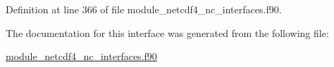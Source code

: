 Definition at line 366 of file module\+\_\+netcdf4\+\_\+nc\+\_\+interfaces.\+f90.



The documentation for this interface was generated from the following file\+:\begin{DoxyCompactItemize}
\item 
\hyperlink{module__netcdf4__nc__interfaces_8f90}{module\+\_\+netcdf4\+\_\+nc\+\_\+interfaces.\+f90}\end{DoxyCompactItemize}
